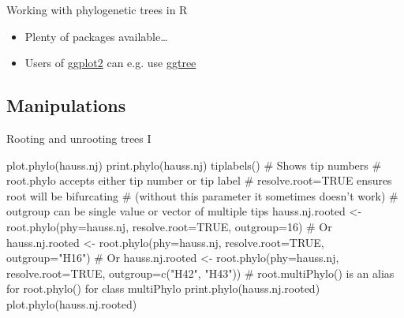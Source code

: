 \documentclass[compress, xelatex, 11pt, xcolor=svgnames, aspectratio=169,
	hyperref={
		bookmarks=true,
		unicode=true,
		colorlinks=true,
		pdftitle={Molecular data in R},
		plainpages=false,
		pdfauthor={Vojtech Zeisek},
		pdfsubject={Course about phylogeny and evolution in R},
		pdfcreator={XeLaTeX},
		pdfkeywords={R, evolution, phylogeny, molecular data},
		linkcolor=Crimson, %
		anchorcolor=Magenta, %
		citecolor=Magenta, %
		filecolor=Magenta, %
		menucolor=Magenta, %
		urlcolor=DodgerBlue, %
		},
	url={hyphens, lowtilde} %
	]{beamer}
\begin{document}
\begin{frame}[allowframebreaks]{Working with phylogenetic trees in R}
\begin{itemize}
\begin{itemize}
			\item Plotting two or more trees together to compare topologies (trees from various methods/genes, tree of plants vs. pollinators,~\ldots)
			\item Preparing trees for subsequent analysis (e.g. character evolution) --- removal of outgroup(s), binding of trees (e.g. crown group from one gene and and stem lineages from another), removal of certain taxa,~\ldots
			\item Comparison and evaluation of multiple gene trees, identification of trees with outlying topology
			\item Construction of species tree or network from set of multiple gene trees
			\item And more\ldots
		\end{itemize}
		\item Plenty of packages available\ldots
		\item Users of \href{https://ggplot2.tidyverse.org/}{ggplot2} can e.g. use \href{https://bioconductor.org/packages/release/bioc/html/ggtree.html}{ggtree}
	\end{itemize}
\end{frame}

\subsection{Manipulations}

\begin{frame}[fragile]{Rooting and unrooting trees I}
	\begin{spluscode}
    plot.phylo(hauss.nj)
    print.phylo(hauss.nj)
    tiplabels() # Shows tip numbers
    # root.phylo accepts either tip number or tip label
    # resolve.root=TRUE ensures root will be bifurcating
    # (without this parameter it sometimes doesn't work)
    # outgroup can be single value or vector of multiple tips
    hauss.nj.rooted <- root.phylo(phy=hauss.nj, resolve.root=TRUE,
      outgroup=16) # Or
    hauss.nj.rooted <- root.phylo(phy=hauss.nj, resolve.root=TRUE,
      outgroup="H16") # Or
    hauss.nj.rooted <- root.phylo(phy=hauss.nj, resolve.root=TRUE,
      outgroup=c("H42", "H43"))
    # root.multiPhylo() is an alias for root.phylo() for class multiPhylo
    print.phylo(hauss.nj.rooted)
    plot.phylo(hauss.nj.rooted)
	\end{spluscode}
\end{frame}
\end{document}
